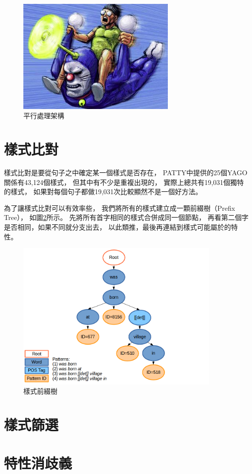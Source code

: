 \begin{figure}
    \centering
    \includegraphics[width=0.7\textwidth]{images/00-tmp-img}    %
    \caption{平行處理架構}
    \label{i:process-parallel}
\end{figure}

\section{樣式比對}
\label{s:pattern-match}

樣式比對是要從句子之中確定某一個樣式是否存在，
PATTY中提供的25個YAGO關係有43,124個樣式，
但其中有不少是重複出現的，
實際上總共有19,031個獨特的樣式，
如果對每個句子都做19,031次比較顯然不是一個好方法。

為了讓樣式比對可以有效率些，
我們將所有的樣式建立成一顆前綴樹（Prefix Tree），
如圖\ref{i:pattern-prefix-tree}所示。
先將所有首字相同的樣式合併成同一個節點，
再看第二個字是否相同，如果不同就分支出去，
以此類推，最後再連結到樣式可能屬於的特性。

\begin{figure}
    \centering
    \includegraphics[width=0.9\textwidth]{images/03-pattern-prefix-tree}
    \caption{樣式前綴樹}
    \label{i:pattern-prefix-tree}
\end{figure}





\section{樣式篩選}
\label{s:select-pattern}

\section{特性消歧義}
\label{s:pattern-disambiguity}


